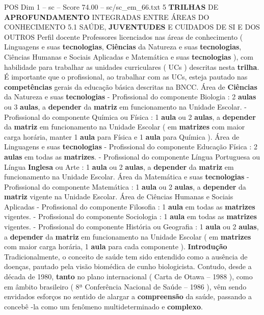 \begin{textsample}{POS Dim 1 – sc – Score 74.00 – sc/sc\_em\_66.txt}  \label{ex:f1_pos_009}
5 \textbf{TRILHAS} DE \textbf{APROFUNDAMENTO} INTEGRADAS ENTRE ÁREAS DO CONHECIMENTO 5.1 SAÚDE, \textbf{JUVENTUDES} E CUIDADOS DE SI E DOS OUTROS Perfil docente Professores licenciados nas áreas de conhecimento ( Linguagens e suas \textbf{tecnologias}, \textbf{Ciências} da Natureza e suas \textbf{tecnologias}, Ciências Humanas e Sociais Aplicadas e Matemática e suas \textbf{tecnologias} ), com habilidade para trabalhar as unidades curriculares ( UCs ) descritas nesta \textbf{trilha}.
É importante que o profissional, ao trabalhar com as UCs, esteja pautado nas \textbf{competências} gerais da educação básica descritas na BNCC.
Área de \textbf{Ciências} da Natureza e suas \textbf{tecnologias} - Profissional do componente Biologia : 2 \textbf{aulas} ou 3 \textbf{aulas}, a \textbf{depender} da \textbf{matriz} em funcionamento na Unidade Escolar. - Profissional do componente Química ou Física : 1 \textbf{aula} ou 2 \textbf{aulas}, a \textbf{depender} da \textbf{matriz} em funcionamento na Unidade Escolar ( em \textbf{matrizes} com maior carga horária, manter 1 \textbf{aula} para Física e 1 \textbf{aula} para Química ).
Área de Linguagens e suas \textbf{tecnologias} - Profissional do componente Educação Física : 2 \textbf{aulas} em todas as \textbf{matrizes}. - Profissional do componente Língua Portuguesa ou Língua \textbf{Inglesa} ou Arte : 1 \textbf{aula} ou 2 \textbf{aulas}, a \textbf{depender} da \textbf{matriz} em funcionamento na Unidade Escolar.
Área da Matemática e suas \textbf{tecnologias} - Profissional do componente Matemática : 1 \textbf{aula} ou 2 \textbf{aulas}, a \textbf{depender} da \textbf{matriz} vigente na Unidade Escolar.
Área de Ciências Humanas e Sociais Aplicadas - Profissional do componente Filosofia : 1 \textbf{aula} em todas as \textbf{matrizes} vigentes. - Profissional do componente Sociologia : 1 \textbf{aula} em todas as \textbf{matrizes} vigentes. - Profissional do componente História ou Geografia : 1 \textbf{aula} ou 2 \textbf{aulas}, a \textbf{depender} da \textbf{matriz} em funcionamento na Unidade Escolar ( em \textbf{matrizes} com maior carga horária, 1 \textbf{aula} para cada componente ). \textbf{Introdução} Tradicionalmente, o conceito de saúde tem sido entendido como a ausência de doenças, pautado pela visão biomédica de cunho biologicista.
Contudo, desde a década de 1980, \textbf{tanto} no plano internacional ( Carta de Otawa – 1988 ), como em âmbito brasileiro ( 8ª Conferência Nacional de Saúde – 1986 ), vêm sendo envidados esforços no sentido de alargar a \textbf{compreensão} da saúde, passando a concebê -la como um fenômeno multideterminado e \textbf{complexo}.

\end{textsample}
